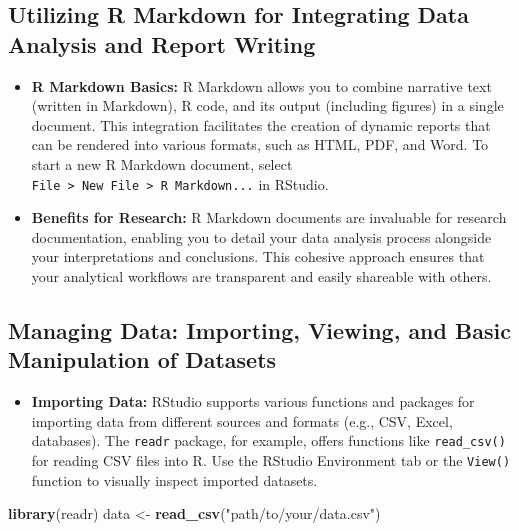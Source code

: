 \documentclass[
]{book}
\newenvironment{Shaded}{\begin{snugshade}}{\end{snugshade}}
\newcommand{\FunctionTok}[1]{\textcolor[rgb]{0.13,0.29,0.53}{\textbf{#1}}}
\newcommand{\NormalTok}[1]{#1}
\newcommand{\OtherTok}[1]{\textcolor[rgb]{0.56,0.35,0.01}{#1}}
\newcommand{\StringTok}[1]{\textcolor[rgb]{0.31,0.60,0.02}{#1}}
\providecommand{\tightlist}{%
  \setlength{\itemsep}{0pt}\setlength{\parskip}{0pt}}
\begin{document}
\subsection*{Utilizing R Markdown for Integrating Data Analysis and Report Writing}\label{utilizing-r-markdown-for-integrating-data-analysis-and-report-writing}

\begin{itemize}
\item
  \textbf{R Markdown Basics:} R Markdown allows you to combine narrative text (written in Markdown), R code, and its output (including figures) in a single document. This integration facilitates the creation of dynamic reports that can be rendered into various formats, such as HTML, PDF, and Word. To start a new R Markdown document, select \texttt{File\ \textgreater{}\ New\ File\ \textgreater{}\ R\ Markdown...} in RStudio.
\item
  \textbf{Benefits for Research:} R Markdown documents are invaluable for research documentation, enabling you to detail your data analysis process alongside your interpretations and conclusions. This cohesive approach ensures that your analytical workflows are transparent and easily shareable with others.
\end{itemize}

\subsection*{Managing Data: Importing, Viewing, and Basic Manipulation of Datasets}\label{managing-data-importing-viewing-and-basic-manipulation-of-datasets}

\begin{itemize}
\tightlist
\item
  \textbf{Importing Data:} RStudio supports various functions and packages for importing data from different sources and formats (e.g., CSV, Excel, databases). The \texttt{readr} package, for example, offers functions like \texttt{read\_csv()} for reading CSV files into R. Use the RStudio Environment tab or the \texttt{View()} function to visually inspect imported datasets.
\end{itemize}

\begin{Shaded}
\begin{Highlighting}[]
\FunctionTok{library}\NormalTok{(readr)}
\NormalTok{data }\OtherTok{\textless{}{-}} \FunctionTok{read\_csv}\NormalTok{(}\StringTok{"path/to/your/data.csv"}\NormalTok{)}
\end{Highlighting}
\end{Shaded}
\end{document}

